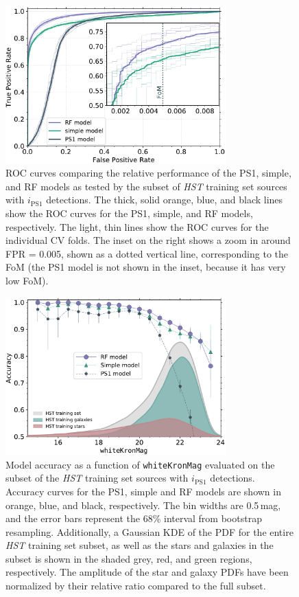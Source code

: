 \documentclass[twocolumn]{aastex62}
\begin{document}
\begin{figure}[t]
 \centering
  \includegraphics[width=3.35in]{./Figures/CV_ROC_HST.pdf}
  \caption{ ROC curves comparing the relative performance of the PS1,
  simple, and RF models as tested by the subset of \textit{HST} training set
  sources with $i_\mathrm{PS1}$ detections. The thick, solid orange, blue,
  and black lines show the ROC curves for the PS1, simple, and RF models,
  respectively. The light, thin lines show the ROC curves for the individual
  CV folds. The inset on the right shows a zoom in around FPR = 0.005, shown
  as a dotted vertical line, corresponding to the FoM (the PS1 model is not
  shown in the inset, because it has very low FoM). }
  \label{fig:cvroc_hst}
\end{figure}

\begin{figure}[t]
 \centering
  \includegraphics[width=3.35in]{./Figures/CV_Accuracy_HST.pdf}
  \caption{Model accuracy as a function of \texttt{whiteKronMag} evaluated
  on the subset of the \textit{HST} training set sources with
  $i_\mathrm{PS1}$ detections. Accuracy curves for the PS1, simple and RF
  models are shown in orange, blue, and black, respectively. The bin widths
  are 0.5\,mag, and the error bars represent the 68\% interval from
  bootstrap resampling. Additionally, a Gaussian KDE of
  the PDF for the entire \textit{HST} training set subset, as well as the
  stars and galaxies in the subset is shown in the shaded grey, red, and
  green regions, respectively. The amplitude of the star and galaxy PDFs
  have been normalized by their relative ratio compared to the full subset. }
  \label{fig:cvacc_hst}
\end{figure}
\end{document}
